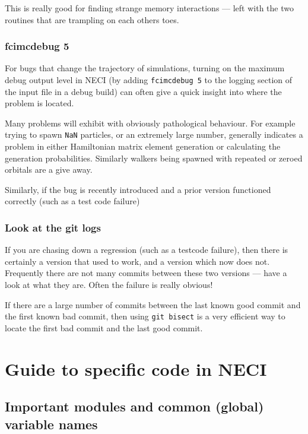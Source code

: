 \documentclass[a4paper,notitlepage]{scrreprt}
\let\code\lstinline
\begin{document}
{{{	This is really good for finding strange memory interactions --- left with
	the two routines that are trampling on each others toes.

\subsection{{\ttfamily fcimcdebug 5}}
	For bugs that change the trajectory of simulations, turning on the maximum
	debug output level in NECI (by adding \code{fcimcdebug 5} to the
	logging section of the input file in a debug build) can often give a quick
	insight into where the problem is located.

	Many problems will exhibit with obviously pathological behaviour. For
	example trying to spawn \code{NaN} particles, or an extremely large
	number, generally indicates a problem in either Hamiltonian matrix element
	generation or calculating the generation probabilities. Similarly walkers
	being spawned with repeated or zeroed orbitals are a give away.

	Similarly, if the bug is recently introduced and a prior version functioned
	correctly (such as a test code failure)

\subsection{Look at the git logs}
	If you are chasing down a regression (such as a testcode failure), then
	there is certainly a version that used to work, and a version which now
	does not. Frequently there are not many commits between these two versions
	--- have a look at what they are. Often the failure is really obvious!

	If there are a large number of commits between the last known good commit
	and the first known bad commit, then using \code{git bisect} is a very
	efficient way to locate the first bad commit and the last good commit.



\chapter{Guide to specific code in NECI}

\section{Important modules and common (global) variable names}
\label{sect:cons-types}

}}}
\end{document}
